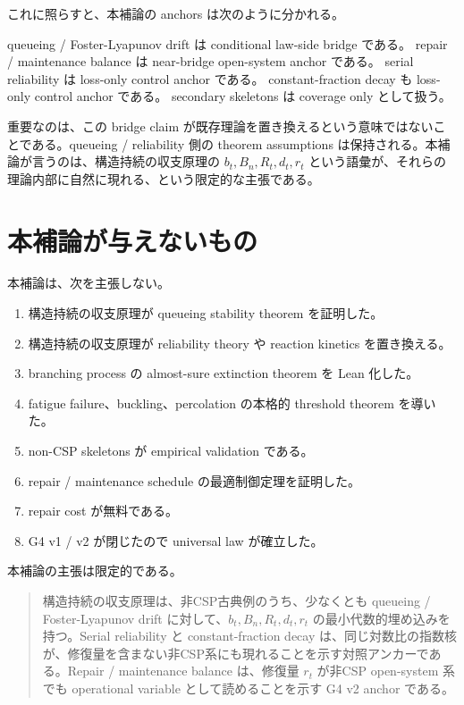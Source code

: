 \documentclass[12pt,a4paper]{article}
\begin{document}
これに照らすと、本補論の anchors は次のように分かれる。

queueing / Foster-Lyapunov drift は conditional law-side bridge である。 repair / maintenance balance は near-bridge open-system anchor である。 serial reliability は loss-only control anchor である。 constant-fraction decay も loss-only control anchor である。 secondary skeletons は coverage only として扱う。

重要なのは、この bridge claim が既存理論を置き換えるという意味ではないことである。queueing / reliability 側の theorem assumptions は保持される。本補論が言うのは、構造持続の収支原理の \(b_{t},B_{n},R_{t},d_{t},r_{t}\) という語彙が、それらの理論内部に自然に現れる、という限定的な主張である。

\section{本補論が与えないもの}\label{ux672cux88dcux8ad6ux304cux4e0eux3048ux306aux3044ux3082ux306e}

本補論は、次を主張しない。

\begin{enumerate}
\def\labelenumi{\arabic{enumi}.}
\tightlist
\item
  構造持続の収支原理が queueing stability theorem を証明した。
\item
  構造持続の収支原理が reliability theory や reaction kinetics を置き換える。
\item
  branching process の almost-sure extinction theorem を Lean 化した。
\item
  fatigue failure、buckling、percolation の本格的 threshold theorem を導いた。
\item
  non-CSP skeletons が empirical validation である。
\item
  repair / maintenance schedule の最適制御定理を証明した。
\item
  repair cost が無料である。
\item
  G4 v1 / v2 が閉じたので universal law が確立した。
\end{enumerate}

本補論の主張は限定的である。

\begin{quote}
構造持続の収支原理は、非CSP古典例のうち、少なくとも queueing / Foster-Lyapunov drift に対して、$b_{t},B_{n},R_{t},d_{t},r_{t}$ の最小代数的埋め込みを持つ。Serial reliability と constant-fraction decay は、同じ対数比の指数核が、修復量を含まない非CSP系にも現れることを示す対照アンカーである。Repair / maintenance balance は、修復量 $r_{t}$ が非CSP open-system 系でも operational variable として読めることを示す G4 v2 anchor である。
\end{quote}
\end{document}
